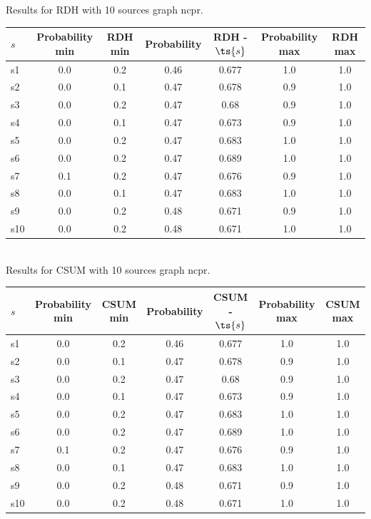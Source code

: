 \documentclass{article}
\begin{document}
\noindent Results for RDH with 10 sources graph ncpr.

\noindent\begin{tabular}{|l|c|c|c|c|c|c|}
\hline
$s$& Probability min & RDH min & Probability & RDH - $\ts{s}$ & Probability max & RDH max\\
\hline
s1 &0.0 & 0.2 & 0.46 & 0.677 & 1.0 & 1.0\\
\hline
s2 &0.0 & 0.1 & 0.47 & 0.678 & 0.9 & 1.0\\
\hline
s3 &0.0 & 0.2 & 0.47 & 0.68 & 0.9 & 1.0\\
\hline
s4 &0.0 & 0.1 & 0.47 & 0.673 & 0.9 & 1.0\\
\hline
s5 &0.0 & 0.2 & 0.47 & 0.683 & 1.0 & 1.0\\
\hline
s6 &0.0 & 0.2 & 0.47 & 0.689 & 1.0 & 1.0\\
\hline
s7 &0.1 & 0.2 & 0.47 & 0.676 & 0.9 & 1.0\\
\hline
s8 &0.0 & 0.1 & 0.47 & 0.683 & 1.0 & 1.0\\
\hline
s9 &0.0 & 0.2 & 0.48 & 0.671 & 0.9 & 1.0\\
\hline
s10 &0.0 & 0.2 & 0.48 & 0.671 & 1.0 & 1.0\\
\hline
\end{tabular}\\

\noindent Results for CSUM with 10 sources graph ncpr.

\noindent\begin{tabular}{|l|c|c|c|c|c|c|}
\hline
$s$& Probability min & CSUM min & Probability & CSUM - $\ts{s}$ & Probability max & CSUM max\\
\hline
s1 &0.0 & 0.2 & 0.46 & 0.677 & 1.0 & 1.0\\
\hline
s2 &0.0 & 0.1 & 0.47 & 0.678 & 0.9 & 1.0\\
\hline
s3 &0.0 & 0.2 & 0.47 & 0.68 & 0.9 & 1.0\\
\hline
s4 &0.0 & 0.1 & 0.47 & 0.673 & 0.9 & 1.0\\
\hline
s5 &0.0 & 0.2 & 0.47 & 0.683 & 1.0 & 1.0\\
\hline
s6 &0.0 & 0.2 & 0.47 & 0.689 & 1.0 & 1.0\\
\hline
s7 &0.1 & 0.2 & 0.47 & 0.676 & 0.9 & 1.0\\
\hline
s8 &0.0 & 0.1 & 0.47 & 0.683 & 1.0 & 1.0\\
\hline
s9 &0.0 & 0.2 & 0.48 & 0.671 & 0.9 & 1.0\\
\hline
s10 &0.0 & 0.2 & 0.48 & 0.671 & 1.0 & 1.0\\
\hline
\end{tabular}\\
\end{document}
